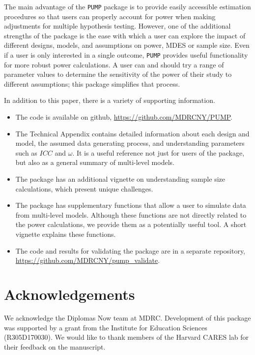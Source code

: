 \documentclass[
]{article}
\providecommand{\tightlist}{%
  \setlength{\itemsep}{0pt}\setlength{\parskip}{0pt}}
\begin{document}
The main advantage of the \texttt{PUMP} package is to provide easily
accessible estimation procedures so that users can properly account for
power when making adjustments for multiple hypothesis testing. However,
one of the additional strengths of the package is the ease with which a
user can explore the impact of different designs, models, and
assumptions on power, MDES or sample size. Even if a user is only
interested in a single outcome, \texttt{PUMP} provides useful
functionality for more robust power calculations. A user can and should
try a range of parameter values to determine the sensitivity of the
power of their study to different assumptions; this package simplifies
that process.

In addition to this paper, there is a variety of supporting information.

\begin{itemize}
\tightlist
\item
  The code is available on github, \url{https://github.com/MDRCNY/PUMP}.
\item
  The Technical Appendix contains detailed information about each design
  and model, the assumed data generating process, and understanding
  parameters such as \(ICC\) and \(\omega\). It is a useful reference
  not just for users of the package, but also as a general summary of
  multi-level models.
\item
  The package has an additional vignette on understanding sample size
  calculations, which present unique challenges.
\item
  The package has supplementary functions that allow a user to simulate
  data from multi-level models. Although these functions are not
  directly related to the power calculations, we provide them as a
  potentially useful tool. A short vignette explains these functions.
\item
  The code and results for validating the package are in a separate
  repository, \url{https://github.com/MDRCNY/pump_validate}.
\end{itemize}

\section*{Acknowledgements}

We acknowledge the Diplomas Now team at MDRC. Development of this
package was supported by a grant from the Institute for Education
Sciences (R305D170030). We would like to thank members of the Harvard
CARES lab for their feedback on the manuscript.
\end{document}
